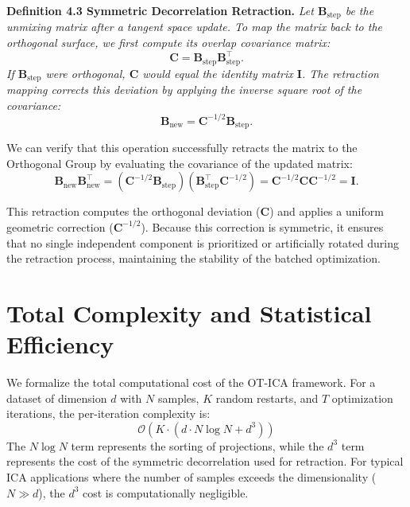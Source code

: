 \documentclass[12pt,a4paper,twoside,openany]{book}
\begin{document}
\vspace{0.5em}
\noindent\textbf{Definition 4.3 Symmetric Decorrelation Retraction.} \textit{Let $\mathbf{B}_{\text{step}}$ be the unmixing matrix after a tangent space update. 
To map the matrix back to the orthogonal surface, we first compute its overlap covariance matrix:}
\begin{equation}
    \mathbf{C} = \mathbf{B}_{\text{step}}\mathbf{B}_{\text{step}}^\top.
\end{equation}
\textit{If $\mathbf{B}_{\text{step}}$ were orthogonal, $\mathbf{C}$ would equal the identity matrix $\mathbf{I}$. The retraction mapping corrects this deviation by applying the inverse square root of the covariance:}
\begin{equation}
    \mathbf{B}_{\text{new}} = \mathbf{C}^{-1/2} \mathbf{B}_{\text{step}}.
\end{equation}

We can verify that this operation successfully retracts the matrix to the Orthogonal Group by evaluating the covariance of the updated matrix:
\begin{equation}
    \mathbf{B}_{\text{new}}\mathbf{B}_{\text{new}}^\top = (\mathbf{C}^{-1/2} \mathbf{B}_{\text{step}}) (\mathbf{B}_{\text{step}}^\top \mathbf{C}^{-1/2}) = \mathbf{C}^{-1/2} \mathbf{C} \mathbf{C}^{-1/2} = \mathbf{I}.
\end{equation}

This retraction computes the orthogonal deviation ($\mathbf{C}$) 
and applies a uniform geometric correction ($\mathbf{C}^{-1/2}$). Because this correction is symmetric, it ensures that no single independent 
component is prioritized or artificially rotated during the retraction process, maintaining the stability of the batched optimization.

\section{Total Complexity and Statistical Efficiency}
\label{sec:total_complexity}
We formalize the total computational cost of the OT-ICA framework. 
For a dataset of dimension $d$ with $N$ samples, $K$ random restarts, and $T$ optimization iterations, the per-iteration complexity is:
\begin{equation}
    \mathcal{O}(K \cdot (d \cdot N \log N + d^3))
\end{equation}
The $N \log N$ term represents the sorting of projections, while the $d^3$ term represents the cost of the symmetric decorrelation 
used for retraction. For typical ICA applications where the number of samples exceeds the dimensionality 
($N \gg d$), the $d^3$ cost is computationally negligible. 
\end{document}
